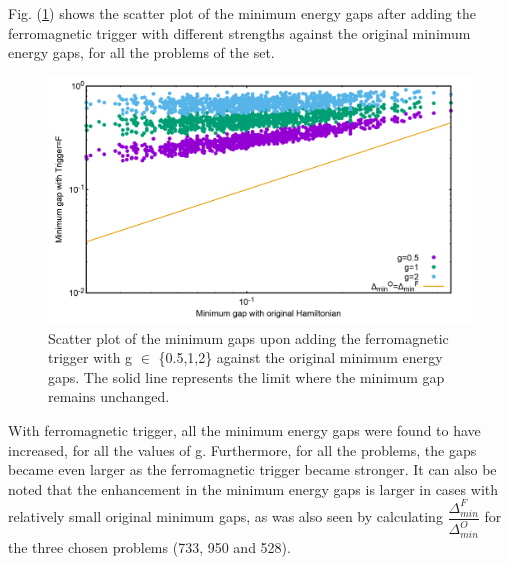 \documentclass[../main.tex]{subfiles}
\begin{document}
Fig. (\ref{fig:f10}) shows the scatter plot of the minimum energy gaps after adding the ferromagnetic trigger with different strengths against the original minimum energy gaps, for all the problems of the set.

\begin{figure}[H]
\centering 
\includegraphics[scale=0.2]{Mingap_F_g0_1_2.png}
\caption{Scatter plot of the minimum gaps upon adding the ferromagnetic trigger with g $\in$ \{0.5,1,2\} against the original minimum energy gaps. The solid line represents the limit where the minimum gap remains unchanged.}
\label{fig:f10}
\end{figure}
With ferromagnetic trigger, all the minimum energy gaps were found to have increased, for  all the values of g. Furthermore, for all the problems, the gaps became even larger as the ferromagnetic trigger became stronger. It can also be noted that the enhancement in the minimum energy gaps is larger in cases with relatively small original minimum gaps, as was also seen by calculating $\dfrac{\Delta_{min}^F}{\Delta_{min}^O}$ for the three chosen problems (733, 950 and 528). 
\end{document}

